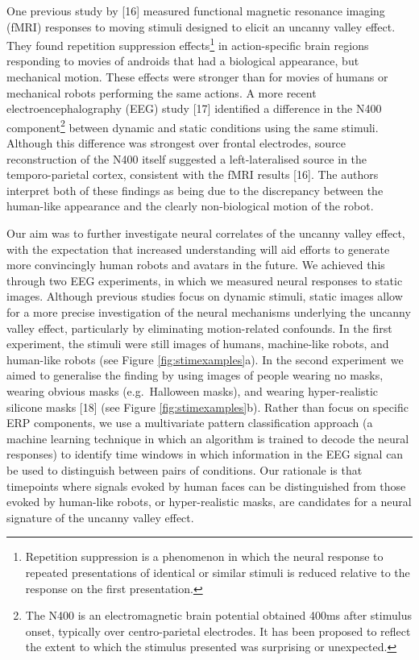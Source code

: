 \documentclass[
]{article}
\begin{document}
One previous study by {[}16{]} measured functional magnetic resonance imaging (fMRI) responses to moving stimuli designed to elicit an uncanny valley effect. They found repetition suppression effects\footnote{Repetition suppression is a phenomenon in which the neural response to repeated presentations of identical or similar stimuli is reduced relative to the response on the first presentation.} in action-specific brain regions responding to movies of androids that had a biological appearance, but mechanical motion. These effects were stronger than for movies of humans or mechanical robots performing the same actions. A more recent electroencephalography (EEG) study {[}17{]} identified a difference in the N400 component\footnote{The N400 is an electromagnetic brain potential obtained 400ms after stimulus onset, typically over centro-parietal electrodes. It has been proposed to reflect the extent to which the stimulus presented was surprising or unexpected.} between dynamic and static conditions using the same stimuli. Although this difference was strongest over frontal electrodes, source reconstruction of the N400 itself suggested a left-lateralised source in the temporo-parietal cortex, consistent with the fMRI results {[}16{]}. The authors interpret both of these findings as being due to the discrepancy between the human-like appearance and the clearly non-biological motion of the robot.

Our aim was to further investigate neural correlates of the uncanny valley effect, with the expectation that increased understanding will aid efforts to generate more convincingly human robots and avatars in the future. We achieved this through two EEG experiments, in which we measured neural responses to static images. Although previous studies focus on dynamic stimuli, static images allow for a more precise investigation of the neural mechanisms underlying the uncanny valley effect, particularly by eliminating motion-related confounds. In the first experiment, the stimuli were still images of humans, machine-like robots, and human-like robots (see Figure \ref{fig:stimexamples}a). In the second experiment we aimed to generalise the finding by using images of people wearing no masks, wearing obvious masks (e.g.~Halloween masks), and wearing hyper-realistic silicone masks {[}18{]} (see Figure \ref{fig:stimexamples}b). Rather than focus on specific ERP components, we use a multivariate pattern classification approach (a machine learning technique in which an algorithm is trained to decode the neural responses) to identify time windows in which information in the EEG signal can be used to distinguish between pairs of conditions. Our rationale is that timepoints where signals evoked by human faces can be distinguished from those evoked by human-like robots, or hyper-realistic masks, are candidates for a neural signature of the uncanny valley effect.
\end{document}
